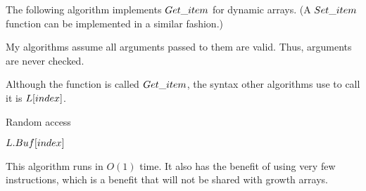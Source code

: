 \HdrDynArrayImpl

The following algorithm implements $\FuncGetItem$ for dynamic arrays. (A $Set\_item$ function can be implemented in a similar fashion.)

{\HdrNote} My algorithms assume all arguments passed to them are valid. Thus, arguments are never checked.

{\HdrNote} Although the function is called $\FuncGetItem$, the syntax other algorithms use to call it is $L[index]$.

\begin{algorithm}[H]
	\caption{Random access \TextDynamicArray}
	\begin{algorithmic}[1]
		\Function{$\FuncGetItem$}{$\VarList,\ \ParamIndex$}
			\State \Return $L.Buf[index]$
		\EndFunction
	\end{algorithmic}
\end{algorithm}

This algorithm runs in $O(1)$ time. It also has the benefit of using very few instructions, which is a benefit that will not be shared with growth arrays.